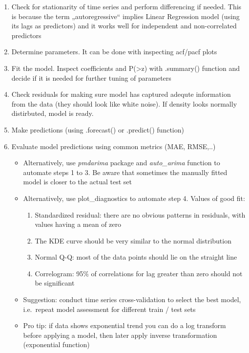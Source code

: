\documentclass[
  letterpaper,
  DIV=11,
  numbers=noendperiod]{scrreprt}
\providecommand{\tightlist}{%
  \setlength{\itemsep}{0pt}\setlength{\parskip}{0pt}}\usepackage{longtable,booktabs,array}
\begin{document}
\begin{itemize}
  \begin{enumerate}
  \def\labelenumi{\arabic{enumi})}
  \item
    Check for stationarity of time series and perform differencing if
    needed. This is because the term „autoregressive`` implies Linear
    Regression model (using its lags as predictors) and it works well
    for independent and non-correlated predictors
  \item
    Determine parameters. It can be done with inspecting acf/pacf plots
  \item
    Fit the model. Inspect coefficients and
    P(\textgreater\textbar z\textbar) with .summary() function and
    decide if it is needed for further tuning of parameters
  \item
    Check residuals for making sure model has captured adequte
    information from the data (they should look like white noise). If
    density looks normally distirbuted, model is ready.
  \item
    Make predictions (using .forecast() or .predict() function)
  \item
    Evaluate model predictions using common metrics (MAE, RMSE,..)

    \begin{itemize}
    \tightlist
    \item
      Alternatively, use \emph{pmdarima} package and \emph{auto\_arima}
      function to automate steps 1 to 3. Be aware that sometimes the
      manually fitted model is closer to the actual test set
    \item
      Alternatively, use plot\_diagnostics to automate step 4. Values of
      good fit:

      \begin{enumerate}
      \def\labelenumii{\alph{enumii}.}
      \tightlist
      \item
        Standardized residual: there are no obvious patterns in
        residuals, with values having a mean of zero
      \item
        The KDE curve should be very similar to the normal distribution
      \item
        Normal Q-Q: most of the data points should lie on the straight
        line
      \item
        Correlogram: 95\% of correlations for lag greater than zero
        should not be significant
      \end{enumerate}
    \item
      Suggestion: conduct time series cross-validation to select the
      best model, i.e.~repeat model assessment for different train /
      test sets
    \item
      Pro tip: if data shows exponential trend you can do a log
      transform before applying a model, then later apply inverse
      transformation (exponential function)
    \end{itemize}
  \end{enumerate}
\end{itemize}
\end{document}
